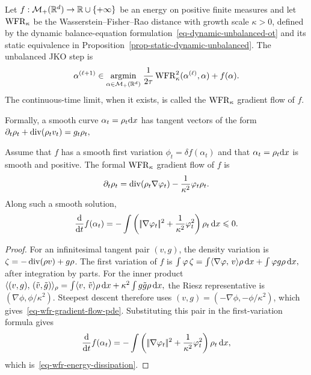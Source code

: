 \begin{defn}\label{def-wfr-jko-gradient-flow}
Let $f:\mathcal{M}_+(\mathbb{R}^d)\to\mathbb{R}\cup\{+\infty\}$ be an energy on positive finite measures and let $\operatorname{WFR}_\kappa$ be the Wasserstein--Fisher--Rao distance with growth scale $\kappa>0$, defined by the dynamic balance-equation formulation~\eqref{eq-dynamic-unbalanced-ot} and its static equivalence in Proposition~\ref{prop-static-dynamic-unbalanced}. The unbalanced JKO step is
\begin{equation}\label{eq-wfr-jko}
\alpha^{(\ell+1)}
\in
\underset{\alpha\in\mathcal{M}_+(\mathbb{R}^d)}{\operatorname{argmin}}\;
\frac{1}{2\tau}\operatorname{WFR}_\kappa^2(\alpha^{(\ell)},\alpha)+f(\alpha).
\end{equation}
The continuous-time limit, when it exists, is called the $\operatorname{WFR}_\kappa$ gradient flow of $f$.
\end{defn}
Formally, a smooth curve $\alpha_t=\rho_t\mathrm{d} x$ has tangent vectors of the form
\(\partial_t\rho_t+\operatorname{div}(\rho_t v_t)=g_t\rho_t,\)
\begin{proposition}\label{prop-wfr-gradient-flow-pde}
Assume that $f$ has a smooth first variation \(\phi_t=\delta f(\alpha_t)\) and that $\alpha_t=\rho_t\mathrm{d} x$ is smooth and positive. The formal $\operatorname{WFR}_\kappa$ gradient flow of $f$ is
\begin{equation}\label{eq-wfr-gradient-flow-pde}
\partial_t\rho_t
=
\operatorname{div}(\rho_t\nabla\varphi_t)
-
\frac{1}{\kappa^2}\varphi_t\rho_t.
\end{equation}
Along such a smooth solution,
\begin{equation}\label{eq-wfr-energy-dissipation}
\frac{\mathrm{d}}{\mathrm{d} t}f(\alpha_t)
=
-\int
\left(|\!| \nabla\varphi_t |\!|^2+\frac{1}{\kappa^2}\varphi_t^2\right)\rho_t\,\mathrm{d} x
\leqslant 0.
\end{equation}
\end{proposition}
\begin{proof}
For an infinitesimal tangent pair $(v,g)$, the density variation is $\zeta=-\operatorname{div}(\rho v)+g\rho$. The first variation of $f$ is \(\int \varphi\,\zeta = \int \langle \nabla\varphi,\,v\rangle\rho\,\mathrm{d} x+\int \varphi g\rho\,\mathrm{d} x,\)
after integration by parts. For the inner product
\(\langle (v,g),\,(\tilde v,\tilde g)\rangle_\rho = \int \langle v,\,\tilde v\rangle\rho\,\mathrm{d} x+\kappa^2\int g\tilde g\rho\,\mathrm{d} x,\)
the Riesz representative is $(\nabla\phi,\phi/\kappa^2)$. Steepest descent therefore uses $(v,g)=(-\nabla\phi,-\phi/\kappa^2)$, which gives~\eqref{eq-wfr-gradient-flow-pde}.
Substituting this pair in the first-variation formula gives
\[
\frac{\mathrm{d}}{\mathrm{d} t}f(\alpha_t)
=
-\int
\left(|\!| \nabla\varphi_t |\!|^2+\frac{1}{\kappa^2}\varphi_t^2\right)\rho_t\,\mathrm{d} x,
\]
which is~\eqref{eq-wfr-energy-dissipation}.
\end{proof}
